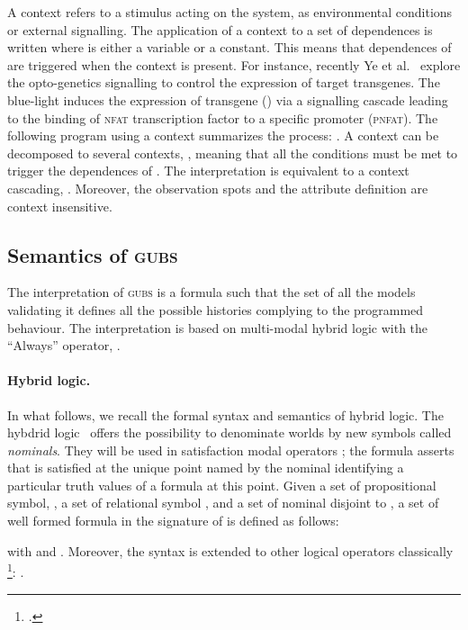 \documentclass{eptcs}
\newcounter{ti}
\begin{document}
A context refers to a stimulus acting on the system, as environmental conditions or external signalling. The application of a context  to a set of dependences  is written  where  is either a variable or a constant. This means that dependences of  are triggered when the context  is present. For instance, recently Ye et al.~\cite{Ye2011} explore the opto-genetics signalling to control the expression of target transgenes. The blue-light induces the expression of transgene () via a signalling cascade leading to the binding of \textsc{nfat} transcription factor to a specific promoter (\textsc{pnfat}). The following program using a context summarizes the process: . A context can be decomposed to several contexts, , meaning that all the conditions must be met to trigger the dependences of . The interpretation is equivalent to a context cascading, . Moreover, the observation spots and the attribute definition are context insensitive.

\subsection{Semantics of \textsc{gubs}}
\label{sec:semantics}
The interpretation of \textsc{gubs} is a formula such that the set of all the 
models validating it defines all the possible histories complying to the programmed behaviour.
The interpretation is based on multi-modal hybrid logic with the ``Always'' operator, .

\paragraph{Hybrid logic.} In what follows, we recall the formal syntax and semantics of hybrid logic.
 The hybdrid logic~\cite{Blackburn2006,Brauner2010} offers the possibility to denominate worlds by new symbols called \textit{nominals}. They will be used in satisfaction modal operators ; the formula  asserts that  is satisfied at the unique point named by the nominal  identifying a particular truth values of a formula at this point. 
Given a set of propositional symbol, , a set of relational symbol , and a set of nominal  disjoint to 
 , a set of well formed formula in the signature of  is defined as follows:
 
with  and .
 Moreover, the syntax is extended to other logical operators classically \footnote{ .}:
 . 
\end{document}
